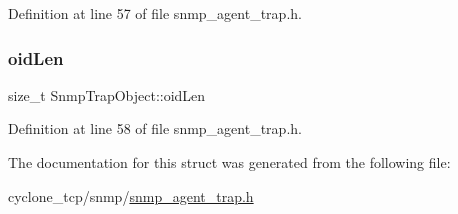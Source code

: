 Definition at line 57 of file snmp\+\_\+agent\+\_\+trap.\+h.

\mbox{\label{structSnmpTrapObject_aec6db360dc31d119d36e2aced7580e5f}} 
\subsubsection{\texorpdfstring{oid\+Len}{oidLen}}
{\footnotesize\ttfamily size\+\_\+t Snmp\+Trap\+Object\+::oid\+Len}



Definition at line 58 of file snmp\+\_\+agent\+\_\+trap.\+h.



The documentation for this struct was generated from the following file\+:\begin{DoxyCompactItemize}
\item 
cyclone\+\_\+tcp/snmp/\hyperlink{snmp__agent__trap_8h}{snmp\+\_\+agent\+\_\+trap.\+h}\end{DoxyCompactItemize}
